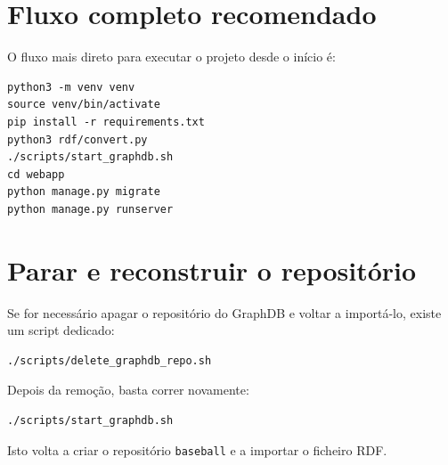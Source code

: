 \section{Fluxo completo recomendado}

O fluxo mais direto para executar o projeto desde o in\'icio \'{e}:

\begin{verbatim}
python3 -m venv venv
source venv/bin/activate
pip install -r requirements.txt
python3 rdf/convert.py
./scripts/start_graphdb.sh
cd webapp
python manage.py migrate
python manage.py runserver
\end{verbatim}

\section{Parar e reconstruir o reposit\'orio}

Se for necess\'ario apagar o reposit\'orio do GraphDB e voltar a import\'a-lo, existe um script dedicado:

\begin{verbatim}
./scripts/delete_graphdb_repo.sh
\end{verbatim}

Depois da remo\c{c}\~ao, basta correr novamente:

\begin{verbatim}
./scripts/start_graphdb.sh
\end{verbatim}

Isto volta a criar o reposit\'orio \texttt{baseball} e a importar o ficheiro RDF.
